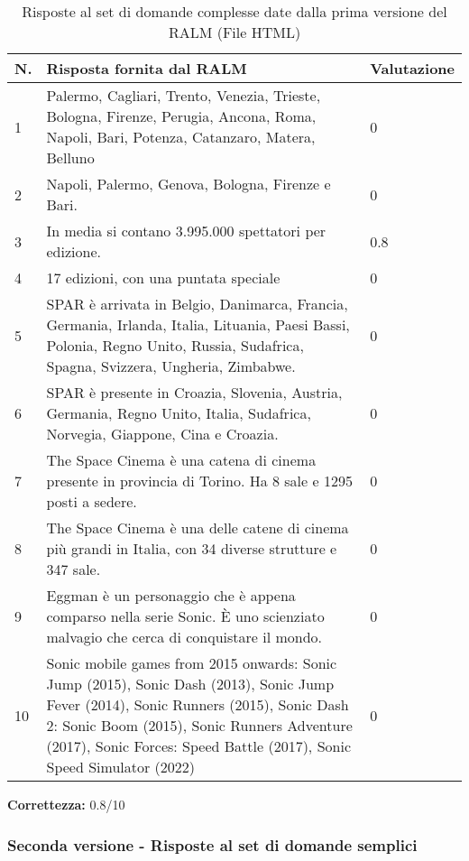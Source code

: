 \begin{table}[H]
    \centering
    \begin{tabular}{|p{0.5cm} |p{6cm} |p{2cm}|}
        \hline
        \textbf{N}. & \textbf{Risposta fornita dal RALM} & \textbf{Valutazione} \\
        \hline
        1 & Palermo, Cagliari, Trento, Venezia, Trieste, Bologna, Firenze, Perugia, Ancona, Roma, Napoli, Bari, Potenza, Catanzaro, Matera, Belluno & 0 \\
        \hline
        2 & Napoli, Palermo, Genova, Bologna, Firenze e Bari. & 0 \\
        \hline
        3 & In media si contano 3.995.000 spettatori per edizione. & 0.8 \\
        \hline
        4 & 17 edizioni, con una puntata speciale & 0 \\
        \hline
        5 & SPAR è arrivata in Belgio, Danimarca, Francia, Germania, Irlanda, Italia, Lituania, Paesi Bassi, Polonia, Regno Unito, Russia, Sudafrica, Spagna, Svizzera, Ungheria, Zimbabwe. & 0 \\
        \hline
        6 & SPAR è presente in Croazia, Slovenia, Austria, Germania, Regno Unito, Italia, Sudafrica, Norvegia, Giappone, Cina e Croazia. & 0 \\
        \hline
        7 & The Space Cinema è una catena di cinema presente in provincia di Torino. Ha 8 sale e 1295 posti a sedere. & 0 \\
        \hline
        8 & The Space Cinema è una delle catene di cinema più grandi in Italia, con 34 diverse strutture e 347 sale.  & 0 \\
        \hline
        9 & Eggman è un personaggio che è appena comparso nella serie Sonic. È uno scienziato malvagio che cerca di conquistare il mondo. & 0 \\
        \hline
        10 & Sonic mobile games from 2015 onwards: Sonic Jump (2015), Sonic Dash (2013), Sonic Jump Fever (2014), Sonic Runners (2015), Sonic Dash 2: Sonic Boom (2015), Sonic Runners Adventure (2017), Sonic Forces: Speed Battle (2017), Sonic Speed Simulator (2022) & 0 \\
        \hline
    \end{tabular}
    \caption{Risposte al set di domande complesse date dalla prima versione del RALM (File HTML)}
\end{table}

\textbf{Correttezza:} 0.8/10

\subsubsection{Seconda versione - Risposte al set di domande semplici}

